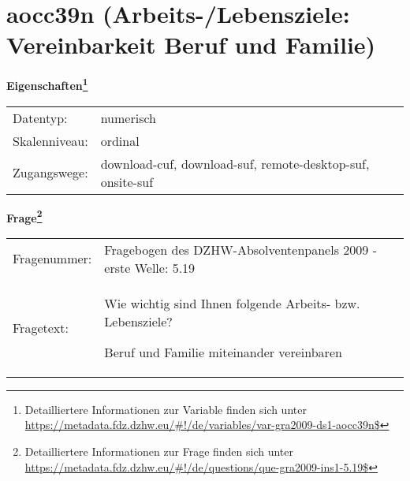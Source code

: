
    \setcounter{footnote}{0}

    \vspace*{-1.8cm}
	\section{aocc39n (Arbeits-/Lebensziele: Vereinbarkeit Beruf und Familie)}
	\label{section:aocc39n}



    \vspace*{0.5cm}
    \noindent\textbf{Eigenschaften\footnote{Detailliertere Informationen zur Variable finden sich unter
		\url{https://metadata.fdz.dzhw.eu/\#!/de/variables/var-gra2009-ds1-aocc39n$}}}\\
	\begin{tabularx}{\hsize}{@{}lX}
	Datentyp: & numerisch \\
	Skalenniveau: & ordinal \\
	Zugangswege: &
	  download-cuf, 
	  download-suf, 
	  remote-desktop-suf, 
	  onsite-suf
 \\
    \end{tabularx}



				\vspace*{0.5cm}
                \noindent\textbf{Frage\footnote{Detailliertere Informationen zur Frage finden sich unter
		              \url{https://metadata.fdz.dzhw.eu/\#!/de/questions/que-gra2009-ins1-5.19$}}}\\
				\begin{tabularx}{\hsize}{@{}lX}
					Fragenummer: &
					  Fragebogen des DZHW-Absolventenpanels 2009 - erste Welle:
					  5.19
 \\
					Fragetext: & Wie wichtig sind Ihnen folgende Arbeits- bzw. Lebensziele?\par  Beruf und Familie miteinander vereinbaren \\
				\end{tabularx}





